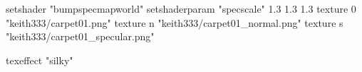 setshader "bumpspecmapworld"
setshaderparam "specscale" 1.3 1.3 1.3
   texture 0 "keith333/carpet01.png"
   texture n "keith333/carpet01_normal.png"
   texture s "keith333/carpet01_specular.png"

texeffect "silky"
